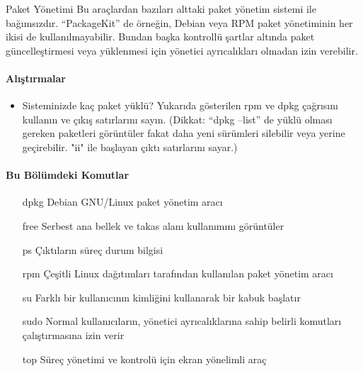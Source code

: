 \begin{section}{Paket Yönetimi}
Bu araçlardan bazıları alttaki paket yönetim sistemi ile bağımsızdır. “PackageKit” de örneğin, Debian veya RPM paket yönetiminin her ikisi de kullanılmayabilir. Bundan başka kontrollü şartlar altında paket güncelleştirmesi veya yüklenmesi için yönetici ayrıcalıkları olmadan izin verebilir.

\paragraph{Alıştırmalar}{
\begin{itemize}
\item Sisteminizde kaç paket yüklü? Yukarıda gösterilen rpm ve dpkg çağrısını kullanın ve çıkış satırlarını sayın. (Dikkat: “dpkg --list” de yüklü olması gereken paketleri görüntüler fakat daha yeni sürümleri silebilir veya yerine geçirebilir. "ii" ile başlayan çıktı satırlarını sayar.)
\end{itemize}}

\paragraph{Bu Bölümdeki Komutlar}{
\begin{itemize}
\item[dpkg]Debian GNU/Linux paket yönetim aracı
\item[free]Serbest ana bellek ve takas alanı kullanımını görüntüler
\item[ps]Çıktıların süreç durum bilgisi
\item[rpm]Çeşitli Linux dağıtımları tarafından kullanılan paket yönetim aracı
\item[su]Farklı bir kullanıcının kimliğini kullanarak bir kabuk başlatır
\item[sudo]Normal kullanıcıların, yönetici ayrıcalıklarına sahip belirli komutları çalıştırmasına izin verir
\item[top]Süreç yönetimi ve kontrolü için ekran yönelimli araç
\end{itemize}}


\end{section}

